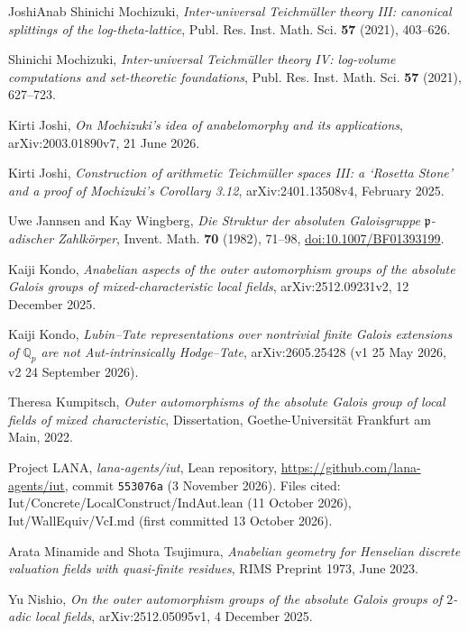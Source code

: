 \documentclass[11pt,a4paper]{article}
\newcommand{\Qp}{\mathbb{Q}_p}
\newcommand{\leanus}{\textunderscore\allowbreak}
\newcommand{\lean}[1]{{\ttfamily\let\_\leanus #1}}
\theoremstyle{plain}
\theoremstyle{definition}
\theoremstyle{remark}
\begin{document}
\begin{thebibliography}{JoshiAnab}
Shinichi Mochizuki, \emph{Inter-universal Teichm\"uller theory III: canonical splittings of the log-theta-lattice},
Publ. Res. Inst. Math. Sci. \textbf{57} (2021), 403--626.

Shinichi Mochizuki, \emph{Inter-universal Teichm\"uller theory IV: log-volume computations and set-theoretic
foundations}, Publ. Res. Inst. Math. Sci. \textbf{57} (2021), 627--723.

Kirti Joshi, \emph{On Mochizuki's idea of anabelomorphy and its applications}, arXiv:2003.01890v7, 21 June 2026.

Kirti Joshi, \emph{Construction of arithmetic Teichm\"uller spaces III: a `Rosetta Stone' and a proof of Mochizuki's
Corollary 3.12}, arXiv:2401.13508v4, February 2025.

Uwe Jannsen and Kay Wingberg, \emph{Die Struktur der absoluten Galoisgruppe $\mathfrak p$-adischer Zahlk\"orper},
Invent. Math. \textbf{70} (1982), 71--98, \href{https://doi.org/10.1007/BF01393199}{doi:10.1007/BF01393199}.

Kaiji Kondo, \emph{Anabelian aspects of the outer automorphism groups of the absolute Galois groups of
mixed-characteristic local fields}, arXiv:2512.09231v2, 12 December 2025.

Kaiji Kondo, \emph{Lubin--Tate representations over nontrivial finite Galois extensions of $\Qp$ are not
Aut-intrinsically Hodge--Tate}, arXiv:2605.25428 (v1 25 May 2026, v2 24 September 2026).

Theresa Kumpitsch, \emph{Outer automorphisms of the absolute Galois group of local fields of mixed characteristic},
Dissertation, Goethe-Universit\"at Frankfurt am Main, 2022.

Project LANA, \emph{lana-agents/iut}, Lean repository, \url{https://github.com/lana-agents/iut}, commit
\texttt{553076a} (3 November 2026). Files cited: \lean{Iut/Concrete/LocalConstruct/IndAut.lean} (11 October 2026),
\lean{Iut/WallEquiv/VcI.md} (first committed 13 October 2026).

Arata Minamide and Shota Tsujimura, \emph{Anabelian geometry for Henselian discrete valuation fields with quasi-finite
residues}, RIMS Preprint 1973, June 2023.

Yu Nishio, \emph{On the outer automorphism groups of the absolute Galois groups of $2$-adic local fields},
arXiv:2512.05095v1, 4 December 2025.


\end{thebibliography}
\end{document}

